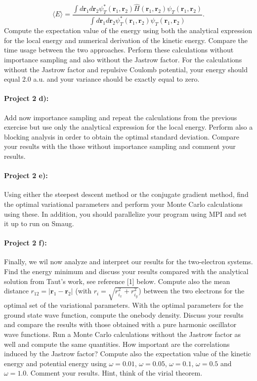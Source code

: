 \documentclass[%
oneside,                 %
final,                   %
10pt]{article}
\begin{document}
\begin{equation}
   \langle E \rangle =
   \frac{\int d\bm{r}_1d\bm{r}_2\psi^{\ast}_T(\bm{r}_1,\bm{r}_2)\hat{H}(\bm{r}_1,\bm{r}_2)\psi_T(\bm{r}_1,\bm{r}_2)}
        {\int d\bm{r}_1d\bm{r}_2\psi^{\ast}_T(\bm{r}_1,\bm{r}_2)\psi_T(\bm{r}_1,\bm{r}_2)}.
\end{equation}
Compute the expectation value of the energy using both the analytical expression for the local energy and numerical derivation of the kinetic energy. Compare the time usage between the two approaches.
Perform these calculations without importance sampling and also without the Jastrow factor. For the calculations without the Jastrow factor and repulsive Coulomb potential, your energy should equal 2.0 a.u. and your variance should be exactly equal to zero.

\paragraph{Project 2 d):}
Add now importance sampling and repeat the calculations from the previous exercise but use only
the analytical expression for the local energy. Perform also a blocking analysis in order to obtain the optimal
standard deviation. Compare your results with the those without importance sampling and comment your results.

\paragraph{Project 2 e):}
Using either the steepest descent method or the conjugate gradient method, find the optimal variational 
parameters and perform your Monte Carlo calculations using these.  
In addition, you should parallelize your program using MPI and set it up to run on Smaug.

\paragraph{Project 2 f):}
Finally, we wil now analyze and interpret our results for the two-electron systems.
Find the  energy minimum and discuss your results compared with the analytical solution from
Taut's work, see reference [1] below. Compute also the mean distance
$r_{12}=\vert \bm{r}_1-\bm{r}_2\vert$ (with $r_i = \sqrt{r_{i_x}^2+r_{i_y}^2}$) between the two electrons for the optimal set of the variational parameters.
With the optimal parameters for the ground state wave function, compute the onebody density. Discuss your results and compare the results with those obtained with a pure harmonic oscillator wave functions. Run a Monte Carlo calculations without the Jastrow factor as well
and compute the same quantities. How important are the correlations induced by the Jastrow factor?
Compute also the expectation value of the kinetic energy and potential energy using $\omega=0.01$, $\omega=0.05$,
$\omega=0.1$, $\omega=0.5$ and $\omega=1.0$. Comment your results. Hint, think of the virial theorem. 
\end{document}
